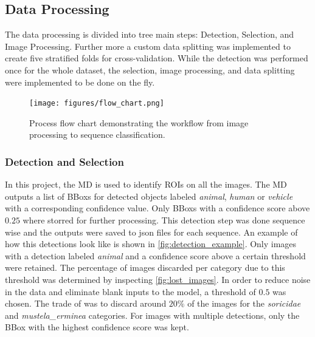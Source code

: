     \subsection{Data Processing}

    The data processing is divided into tree main steps: Detection, Selection, and Image Processing. 
    Further more a custom data splitting was implemented to create five stratified folds for cross-validation.
    While the detection was performed once for the whole dataset, the selection, image processing, and data splitting were implemented to be done on the fly.

    \begin{figure}[p]
    \centering
    \texttt{[image: figures/flow\_chart.png]}
    \caption{Process flow chart demonstrating the workflow from image processing to sequence classification.}
    \label{fig:process_flow_diagram}
    \end{figure}

        \subsubsection{Detection and Selection}
    
        In this project, the \ac{MD} \autocite{morrisEfficientPipelineCamera2025} is used to identify \acp{ROI} on all the images.
        The \ac{MD} outputs a list of \acp{BBox} for detected objects labeled \textit{animal}, \textit{human} or \textit{vehicle} with a corresponding confidence value.
        Only \acp{BBox} with a confidence score above \(0.25\) where storred for further processing.
        This detection step was done sequence wise and the outputs were saved to json files for each sequence.
        An example of how this detections look like is shown in \autoref{fig:detection_example}.
        Only images with a detection labeled \textit{animal} and a confidence score above a certain threshold were retained.  
        The percentage of images discarded per category due to this threshold was determined by inspecting \autoref{fig:lost_images}.  
        In order to reduce noise in the data and eliminate blank inputs to the model, a threshold of \(0.5\) was chosen.
        The trade of was to discard around \(20\%\) of the images for the \textit{soricidae} and \textit{mustela\_erminea} categories.
        For images with multiple detections, only the \ac{BBox} with the highest confidence score was kept.

